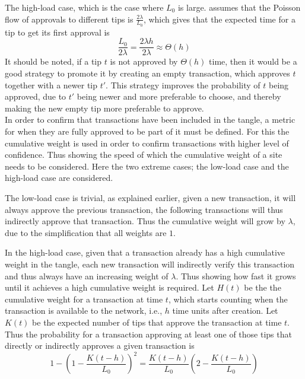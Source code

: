 The high-load case, which is the case where $L_0$ is large. \cite{tangle} assumes that the Poisson flow of approvals to different tips is $\frac{2\lambda}{L_0}$, which gives that the expected time for a tip to get its first approval is 
\begin{equation}
    \frac{L_{0}}{2\lambda} = \frac{2\lambda h}{2\lambda} \approx \Theta(h)
\end{equation}
It should be noted, if a tip $t$ is not approved by $\Theta(h)$ time, then it would be a good strategy to promote it by creating an empty transaction, which approves $t$ together with a newer tip $t'$. This strategy improves the probability of $t$ being approved, due to $t'$ being newer and more preferable to choose, and thereby making the new empty tip more preferable to approve. \\


In order to confirm that transactions have been included in the tangle, a metric for when they are fully approved to be part of it must be defined. For this the cumulative weight is used in order to confirm transactions with higher level of confidence. Thus showing the speed of which the cumulative weight of a site needs to be considered. Here the two extreme cases; the low-load case and the high-load case are considered. 

The low-load case is trivial, as explained earlier, given a new transaction, it will always approve the previous transaction, the following transactions will thus indirectly approve that transaction. Thus the cumulative weight will grow by $\lambda$, due to the simplification that all weights are $1$.

In the high-load case, given that a transaction already has a high cumulative weight in the tangle, each new transaction will indirectly verify this transaction and thus always have an increasing weight of $\lambda$. Thus showing how fast it grows until it achieves a high cumulative weight is required. Let $H(t)$ be the the cumulative weight for a transaction at time $t$, which starts counting when the transaction is available to the network, i.e., $h$ time units after creation. Let $K(t)$ be the expected number of tips that approve the transaction at time $t$. Thus the probability for a transaction approving at least one of those tips that directly or indirectly approves a given transaction is 
\begin{equation}
\label{eq:iota-our-tip-selected}
    1- \left(1- \frac{K(t-h)}{L_0}\right)^2 = \frac{K(t-h)}{L_0}\left(2-\frac{K(t-h)}{L_0}\right)
\end{equation}

